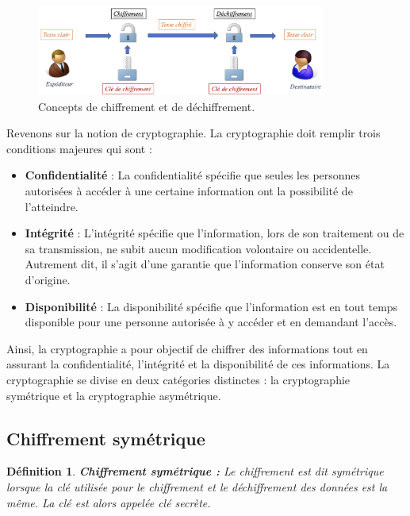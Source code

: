 \documentclass[oneside]{book}
\newtheorem{definition}{Définition}[section]
\begin{document}
\begin{figure}[htbp]
    \centering
    \includegraphics[width=0.85\textwidth]{image/fondamentaux_crypto}
    \caption{Concepts de chiffrement et de déchiffrement.}
    \label{fig:fondamentaux_crypto}
\end{figure}


\hspace{-0.5cm}Revenons sur la notion de cryptographie. La cryptographie doit remplir trois conditions majeures qui sont :
\begin{itemize}
\item \textbf{Confidentialité} : La confidentialité spécifie que seules les personnes autorisées à accéder à une certaine information ont la possibilité de l'atteindre.
\item \textbf{Intégrité} : L'intégrité spécifie que l'information, lors de son traitement ou de sa transmission, ne subit aucun modification volontaire ou accidentelle. Autrement dit, il s'agit d'une garantie que l'information conserve son état d'origine.
\item \textbf{Disponibilité} : La disponibilité spécifie que l'information est en tout temps disponible pour une personne autorisée à y accéder et en demandant l'accès. \\
\end{itemize}

Ainsi, la cryptographie a pour objectif de chiffrer des informations tout en assurant la confidentialité, l'intégrité et la disponibilité de ces informations. La cryptographie se divise en deux catégories distinctes : la cryptographie symétrique et la cryptographie asymétrique. 

\subsection{Chiffrement symétrique}
\label{subsec:Chiffrement_symétrique}

\theoremstyle{definition}
\begin{definition}{\textbf{Chiffrement symétrique :}}
Le chiffrement est dit symétrique lorsque la clé utilisée pour le chiffrement et le déchiffrement des données est la même. La clé est alors appelée \textit{clé secrète}. 
\end{definition}
\end{document}
